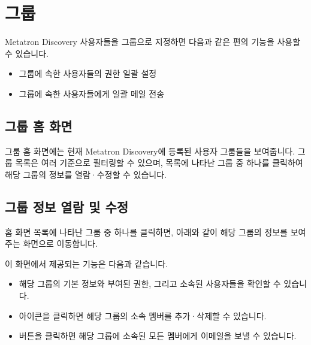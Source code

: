 \documentclass[letterpaper,10pt,english]{sphinxmanual}
\begin{document}
\section{그룹}
\label{\detokenize{discovery/part08/groups:user-groups}}\label{\detokenize{discovery/part08/groups:id1}}\label{\detokenize{discovery/part08/groups::doc}}
Metatron Discovery 사용자들을 그룹으로 지정하면 다음과 같은 편의 기능을 사용할 수 있습니다.
\begin{itemize}
\item {} 
그룹에 속한 사용자들의 권한 일괄 설정

\item {} 
그룹에 속한 사용자들에게 일괄 메일 전송

\end{itemize}


\subsection{그룹 홈 화면}
\label{\detokenize{discovery/part08/groups:id2}}
그룹 홈 화면에는 현재 Metatron Discovery에 등록된 사용자 그룹들을 보여줍니다.
그룹 목록은 여러 기준으로 필터링할 수 있으며, 목록에 나타난 그룹 중 하나를 클릭하여 해당 그룹의 정보를 열람·수정할 수 있습니다.
\begin{quote}

\begin{figure}[H]
\centering

\noindent{}
\end{figure}
\end{quote}


\subsection{그룹 정보 열람 및 수정}
\label{\detokenize{discovery/part08/groups:id3}}
홈 화면 목록에 나타난 그룹 중 하나를 클릭하면, 아래와 같이 해당 그룹의 정보를 보여주는 화면으로 이동합니다.
\begin{quote}

\begin{figure}[H]
\centering

\noindent{}
\end{figure}
\end{quote}

이 화면에서 제공되는 기능은 다음과 같습니다.
\begin{itemize}
\item {} 
해당 그룹의 기본 정보와 부여된 권한, 그리고 소속된 사용자들을 확인할 수 있습니다.

\item {} 
 아이콘을 클릭하면 해당 그룹의 소속 멤버를 추가·삭제할 수 있습니다.

\item {} 
 버튼을 클릭하면 해당 그룹에 소속된 모든 멤버에게 이메일을 보낼 수 있습니다.

\end{itemize}
\end{document}
